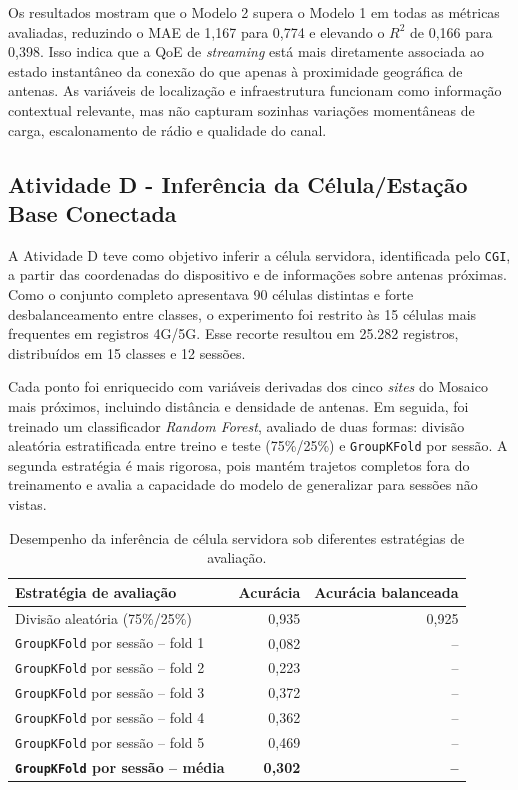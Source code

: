 \documentclass[11pt,a4paper]{article}
\begin{document}
Os resultados mostram que o Modelo 2 supera o Modelo 1 em todas as métricas avaliadas, reduzindo o MAE de 1,167 para 0,774 e elevando o $R^2$ de 0,166 para 0,398. Isso indica que a QoE de \emph{streaming} está mais diretamente associada ao estado instantâneo da conexão do que apenas à proximidade geográfica de antenas. As variáveis de localização e infraestrutura funcionam como informação contextual relevante, mas não capturam sozinhas variações momentâneas de carga, escalonamento de rádio e qualidade do canal.


\subsection{Atividade D - Inferência da Célula/Estação Base Conectada}
\label{sec:opcional-d}

A Atividade D teve como objetivo inferir a célula servidora, identificada pelo \texttt{CGI}, a partir das coordenadas do dispositivo e de informações sobre antenas próximas. Como o conjunto completo apresentava 90 células distintas e forte desbalanceamento entre classes, o experimento foi restrito às 15 células mais frequentes em registros 4G/5G. Esse recorte resultou em 25.282 registros, distribuídos em 15 classes e 12 sessões.

Cada ponto foi enriquecido com variáveis derivadas dos cinco \emph{sites} do Mosaico mais próximos, incluindo distância e densidade de antenas. Em seguida, foi treinado um classificador \emph{Random Forest}, avaliado de duas formas: divisão aleatória estratificada entre treino e teste (75\%/25\%) e \texttt{GroupKFold} por sessão. A segunda estratégia é mais rigorosa, pois mantém trajetos completos fora do treinamento e avalia a capacidade do modelo de generalizar para sessões não vistas.

\begin{table}[H]
\centering
\caption{Desempenho da inferência de célula servidora sob diferentes estratégias de avaliação.}
\label{tab:atividadeD}
\begin{tabular}{lrr}
\toprule
\textbf{Estratégia de avaliação} & \textbf{Acurácia} & \textbf{Acurácia balanceada} \\
\midrule
Divisão aleatória (75\%/25\%) & 0,935 & 0,925 \\
\texttt{GroupKFold} por sessão -- fold 1 & 0,082 & -- \\
\texttt{GroupKFold} por sessão -- fold 2 & 0,223 & -- \\
\texttt{GroupKFold} por sessão -- fold 3 & 0,372 & -- \\
\texttt{GroupKFold} por sessão -- fold 4 & 0,362 & -- \\
\texttt{GroupKFold} por sessão -- fold 5 & 0,469 & -- \\
\textbf{\texttt{GroupKFold} por sessão -- média} & \textbf{0,302} & \textbf{--} \\
\bottomrule
\end{tabular}
\end{table}
\end{document}

